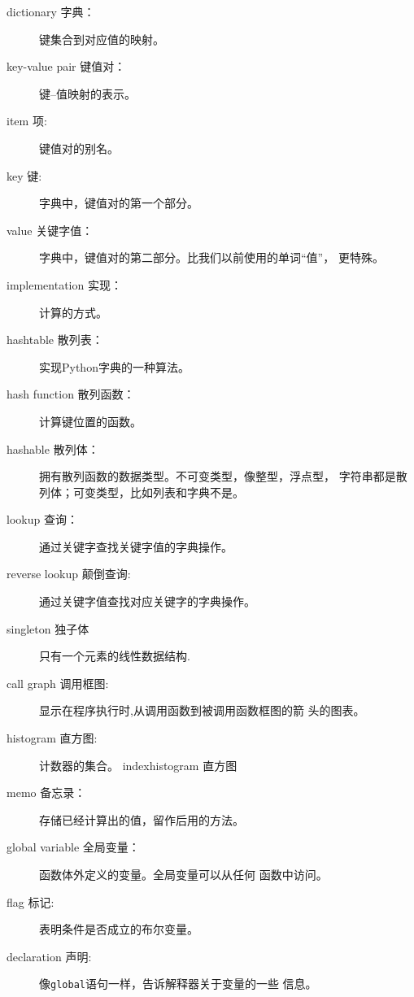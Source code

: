 \begin{description}

\item [dictionary 字典：]键集合到对应值的映射。

\item [key-value pair 键值对：]键--值映射的表示。

\item [item 项:]键值对的别名。

\item [key 键:] 字典中，键值对的第一个部分。

\item [value 关键字值：]字典中，键值对的第二部分。比我们以前使用的单词“值”，
更特殊。

\item [implementation 实现：]计算的方式。

\item [hashtable 散列表：]实现Python字典的一种算法。

\item [hash function 散列函数：]计算键位置的函数。

\item [hashable 散列体：]拥有散列函数的数据类型。不可变类型，像整型，浮点型，
字符串都是散列体；可变类型，比如列表和字典不是。

\item [lookup 查询：]通过关键字查找关键字值的字典操作。

\item [reverse lookup 颠倒查询:]通过关键字值查找对应关键字的字典操作。

\item[singleton 独子体]只有一个元素的线性数据结构.

\item [call graph 调用框图:]显示在程序执行时,从调用函数到被调用函数框图的箭
头的图表。

\item [histogram 直方图:]计数器的集合。
index{histogram 直方图}

\item [memo 备忘录：]存储已经计算出的值，留作后用的方法。

\item [global variable 全局变量：]函数体外定义的变量。全局变量可以从任何
函数中访问。

\item [flag 标记:]表明条件是否成立的布尔变量。

\item [declaration 声明:] 像{\tt global}语句一样，告诉解释器关于变量的一些
信息。

\end{description}



